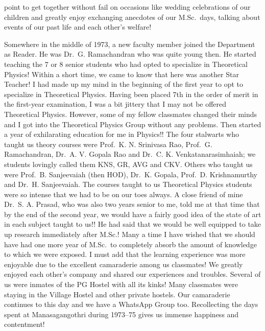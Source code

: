 point to get together without fail on occasions like wedding celebrations of our children and greatly enjoy exchanging anecdotes of our M.Sc.\ days, talking about events of our past life and each other's welfare!

Somewhere in the middle of 1973, a new faculty member joined the Department as Reader. He was Dr.\ G. Ramachandran who was quite young then. He started teaching the 7 or 8 senior students who had opted to specialize in Theoretical Physics! Within a short time, we came to know that here was another Star Teacher! I had made up my mind in the beginning of the first year to opt to specialize in Theoretical Physics. Having been placed 7th in the order of merit in the first-year examination, I was a bit jittery that I may not be offered Theoretical Physics. However, some of my fellow classmates changed their minds and I got into the Theoretical Physics Group without any problems. Then started a year of exhilarating education for me in Physics!! The four stalwarts who taught us theory courses were Prof.\ K. N. Srinivasa Rao, Prof.\ G. Ramachandran, Dr.\ A. V. Gopala Rao and Dr.\ C. K. Venkatanarasimhaiah; we students lovingly called them KNS, GR, AVG and CKV. Others who taught us were Prof.\ B. Sanjeevaiah (then HOD), Dr.\ K. Gopala, Prof.\ D. Krishnamurthy and Dr.\ H. Sanjeevaiah. The courses taught to us Theoretical Physics students were so intense that we had to be on our toes always. A close friend of mine Dr.\ S. A. Prasad, who was also two years senior to me, told me at that time that by the end of the second year, we would have a fairly good idea of the state of art in each subject taught to us!! He had said that we would be well equipped to take up research immediately after M.Sc.! Many a time I have wished that we should have had one more year of M.Sc.\ to completely absorb the amount of knowledge to which we were exposed. I must add that the learning experience was more enjoyable due to the excellent camaraderie among us classmates! We greatly enjoyed each other's company and shared our experiences and troubles. Several of us were inmates of the PG Hostel with all its kinks! Many classmates were staying in the Village Hostel and other private hostels. Our camaraderie continues to this day and we have a WhatsApp Group too. Recollecting the days spent at Manasagangothri during 1973--75 gives us immense happiness and contentment!

